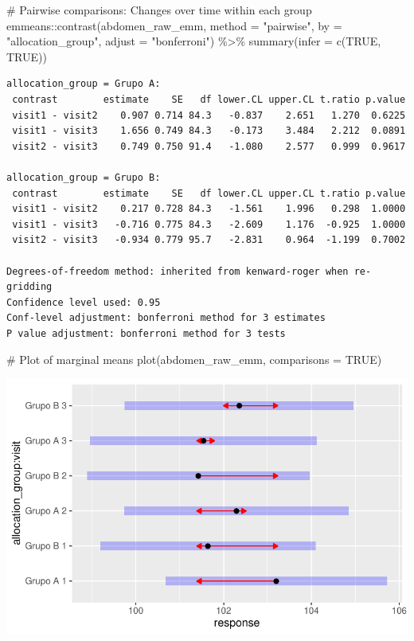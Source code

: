 \documentclass[
  12pt,
]{article}
\newenvironment{Shaded}{\begin{snugshade}}{\end{snugshade}}
\newcommand{\AttributeTok}[1]{\textcolor[rgb]{0.40,0.45,0.13}{#1}}
\newcommand{\CommentTok}[1]{\textcolor[rgb]{0.37,0.37,0.37}{#1}}
\newcommand{\ConstantTok}[1]{\textcolor[rgb]{0.56,0.35,0.01}{#1}}
\newcommand{\FunctionTok}[1]{\textcolor[rgb]{0.28,0.35,0.67}{#1}}
\newcommand{\NormalTok}[1]{\textcolor[rgb]{0.00,0.23,0.31}{#1}}
\newcommand{\SpecialCharTok}[1]{\textcolor[rgb]{0.37,0.37,0.37}{#1}}
\newcommand{\StringTok}[1]{\textcolor[rgb]{0.13,0.47,0.30}{#1}}
\begin{document}
\begin{Shaded}
\begin{Highlighting}[]
\CommentTok{\# Pairwise comparisons: Changes over time within each group}
\NormalTok{emmeans}\SpecialCharTok{::}\FunctionTok{contrast}\NormalTok{(abdomen\_raw\_emm,}
\AttributeTok{method =} \StringTok{"pairwise"}\NormalTok{, }\AttributeTok{by =} \StringTok{"allocation\_group"}\NormalTok{,}
\AttributeTok{adjust =} \StringTok{"bonferroni"}\NormalTok{) }\SpecialCharTok{\%\textgreater{}\%} \FunctionTok{summary}\NormalTok{(}\AttributeTok{infer =} \FunctionTok{c}\NormalTok{(}\ConstantTok{TRUE}\NormalTok{, }\ConstantTok{TRUE}\NormalTok{))}
\end{Highlighting}
\end{Shaded}

\begin{verbatim}
allocation_group = Grupo A:
 contrast        estimate    SE   df lower.CL upper.CL t.ratio p.value
 visit1 - visit2    0.907 0.714 84.3   -0.837    2.651   1.270  0.6225
 visit1 - visit3    1.656 0.749 84.3   -0.173    3.484   2.212  0.0891
 visit2 - visit3    0.749 0.750 91.4   -1.080    2.577   0.999  0.9617

allocation_group = Grupo B:
 contrast        estimate    SE   df lower.CL upper.CL t.ratio p.value
 visit1 - visit2    0.217 0.728 84.3   -1.561    1.996   0.298  1.0000
 visit1 - visit3   -0.716 0.775 84.3   -2.609    1.176  -0.925  1.0000
 visit2 - visit3   -0.934 0.779 95.7   -2.831    0.964  -1.199  0.7002

Degrees-of-freedom method: inherited from kenward-roger when re-gridding 
Confidence level used: 0.95 
Conf-level adjustment: bonferroni method for 3 estimates 
P value adjustment: bonferroni method for 3 tests 
\end{verbatim}

\begin{Shaded}
\begin{Highlighting}[]
\CommentTok{\# Plot of marginal means}
\FunctionTok{plot}\NormalTok{(abdomen\_raw\_emm, }\AttributeTok{comparisons =} \ConstantTok{TRUE}\NormalTok{)}
\end{Highlighting}
\end{Shaded}

\includegraphics{Outcomes_files/figure-pdf/labs_abdomen_raw_emm-1.pdf}
\end{document}
